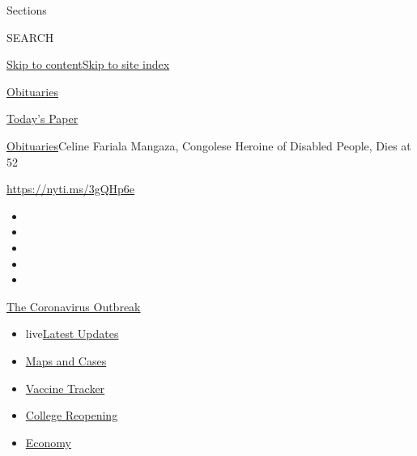 Sections

SEARCH

\protect\hyperlink{site-content}{Skip to
content}\protect\hyperlink{site-index}{Skip to site index}

\href{https://www.nytimes.com/section/obituaries}{Obituaries}

\href{https://myaccount.nytimes.com/auth/login?response_type=cookie\&client_id=vi}{}

\href{https://www.nytimes.com/section/todayspaper}{Today's Paper}

\href{/section/obituaries}{Obituaries}\textbar{}Celine Fariala Mangaza,
Congolese Heroine of Disabled People, Dies at 52

\url{https://nyti.ms/3gQHp6e}

\begin{itemize}
\item
\item
\item
\item
\item
\end{itemize}

\href{https://www.nytimes.com/news-event/coronavirus?action=click\&pgtype=Article\&state=default\&region=TOP_BANNER\&context=storylines_menu}{The
Coronavirus Outbreak}

\begin{itemize}
\tightlist
\item
  live\href{https://www.nytimes.com/2020/08/03/world/coronavirus-covid-19.html?action=click\&pgtype=Article\&state=default\&region=TOP_BANNER\&context=storylines_menu}{Latest
  Updates}
\item
  \href{https://www.nytimes.com/interactive/2020/us/coronavirus-us-cases.html?action=click\&pgtype=Article\&state=default\&region=TOP_BANNER\&context=storylines_menu}{Maps
  and Cases}
\item
  \href{https://www.nytimes.com/interactive/2020/science/coronavirus-vaccine-tracker.html?action=click\&pgtype=Article\&state=default\&region=TOP_BANNER\&context=storylines_menu}{Vaccine
  Tracker}
\item
  \href{https://www.nytimes.com/2020/08/02/us/covid-college-reopening.html?action=click\&pgtype=Article\&state=default\&region=TOP_BANNER\&context=storylines_menu}{College
  Reopening}
\item
  \href{https://www.nytimes.com/live/2020/08/03/business/stock-market-today-coronavirus?action=click\&pgtype=Article\&state=default\&region=TOP_BANNER\&context=storylines_menu}{Economy}
\end{itemize}

